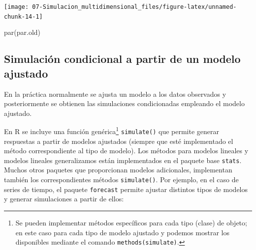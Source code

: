 \documentclass[
]{book}
\newenvironment{Shaded}{\begin{snugshade}}{\end{snugshade}}
\newcommand{\AttributeTok}[1]{\textcolor[rgb]{0.77,0.63,0.00}{#1}}
\newcommand{\DecValTok}[1]{\textcolor[rgb]{0.00,0.00,0.81}{#1}}
\newcommand{\FunctionTok}[1]{\textcolor[rgb]{0.00,0.00,0.00}{#1}}
\newcommand{\NormalTok}[1]{#1}
\newcommand{\SpecialCharTok}[1]{\textcolor[rgb]{0.00,0.00,0.00}{#1}}
\newcommand{\StringTok}[1]{\textcolor[rgb]{0.31,0.60,0.02}{#1}}
\theoremstyle{break}
\theoremstyle{definition}
\theoremstyle{definition}
\theoremstyle{definition}
\theoremstyle{definition}
\theoremstyle{remark}
\begin{document}
\begin{Shaded}
\end{Shaded}

\begin{center}\texttt{[image: 07-Simulacion\_multidimensional\_files/figure-latex/unnamed-chunk-14-1]} \end{center}

\begin{Shaded}
\begin{Highlighting}[]
\FunctionTok{par}\NormalTok{(par.old)}
\end{Highlighting}
\end{Shaded}

\hypertarget{simulaciuxf3n-condicional-a-partir-de-un-modelo-ajustado}{%
\subsection{Simulación condicional a partir de un modelo ajustado}\label{simulaciuxf3n-condicional-a-partir-de-un-modelo-ajustado}}

En la práctica normalmente se ajusta un modelo a los datos observados y posteriormente se obtienen las simulaciones condicionadas empleando el modelo ajustado.

En R se incluye una función genérica\footnote{Se pueden implementar métodos específicos para cada tipo (clase) de objeto; en este caso para cada tipo de modelo ajustado y podemos mostrar los disponibles mediante el comando \texttt{methods(simulate)}.} \texttt{simulate()} que permite generar respuestas a partir de modelos ajustados (siempre que esté implementado el método correspondiente al tipo de modelo).
Los métodos para modelos lineales y modelos lineales generalizamos están implementados en el paquete base \texttt{stats}.
Muchos otros paquetes que proporcionan modelos adicionales, implementan también los correspondientes métodos \texttt{simulate()}.
Por ejemplo, en el caso de series de tiempo, el paquete \texttt{forecast} permite ajustar distintos tipos de modelos y generar simulaciones a partir de ellos:
\end{document}
